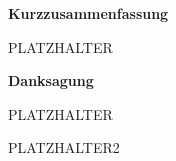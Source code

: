 \begin{titlepage}

\vspace{6cm}

\Huge
\textbf{Kurzzusammenfassung}

\vspace{2cm}

\normalsize
PLATZHALTER
\end{titlepage}

\begin{titlepage}

\vspace{6cm}

\Huge
\textbf{Danksagung}

\vspace{2cm}

\normalsize
PLATZHALTER

\vspace{0.4cm}

PLATZHALTER2
\end{titlepage}